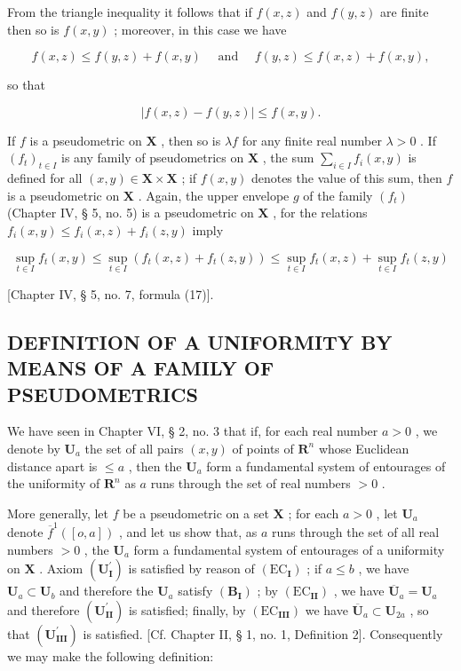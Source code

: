 From the triangle inequality it follows that if \(f(x, z)\) and \(f(y, z)\) are finite then so is \(f(x, y)\) ; moreover, in this case we have

\[
f (x, z) \leqslant f (y, z) + f (x, y) \quad \text { and } \quad f (y, z) \leqslant f (x, z) + f (x, y),
\]

so that

\[
\left| f (x, z) - f (y, z) \right| \leqslant f (x, y).\tag{1}
\]

If \(f\) is a pseudometric on \(\mathbf{X}\) , then so is \(\lambda f\) for any finite real number \(\lambda > 0\) . If \((f_t)_{t \in I}\) is any family of pseudometrics on \(\mathbf{X}\) , the sum \(\sum_{i \in I} f_i(x, y)\) is defined for all \((x, y) \in \mathbf{X} \times \mathbf{X}\) ; if \(f(x, y)\) denotes the value of this sum, then \(f\) is a pseudometric on \(\mathbf{X}\) . Again, the upper envelope \(g\) of the family \((f_t)\) (Chapter IV, § 5, no. 5) is a pseudometric on \(\mathbf{X}\) , for the relations \(f_i(x, y) \leqslant f_i(x, z) + f_i(z, y)\) imply

\[
\sup _ {t \in I} f _ {t} (x, y) \leqslant \sup _ {t \in I} \left(f _ {t} (x, z) + f _ {t} (z, y)\right) \leqslant \sup _ {t \in I} f _ {t} (x, z) + \sup _ {t \in I} f _ {t} (z, y)
\]

{[}Chapter IV, § 5, no. 7, formula (17){]}.

\subsection{DEFINITION OF A UNIFORMITY BY MEANS OF A FAMILY OF PSEUDOMETRICS}

We have seen in Chapter VI, § 2, no. 3 that if, for each real number \(a > 0\) , we denote by \(\mathbf{U}_a\) the set of all pairs \((x, y)\) of points of \(\mathbf{R}^n\) whose Euclidean distance apart is \(\leqslant a\) , then the \(\mathbf{U}_a\) form a fundamental system of entourages of the uniformity of \(\mathbf{R}^n\) as \(a\) runs through the set of real numbers \(> 0\) .

More generally, let \(f\) be a pseudometric on a set \(\mathbf{X}\) ; for each \(a > 0\) , let \(\mathbf{U}_a\) denote \(\overline{f}^{1}([o, a])\) , and let us show that, as \(a\) runs through the set of all real numbers \(> 0\) , the \(\mathbf{U}_a\) form a fundamental system of entourages of a uniformity on \(\mathbf{X}\) . Axiom \((\mathbf{U}_{\mathbf{I}}^{\prime})\) is satisfied by reason of \((\mathrm{EC}_{\mathbf{I}})\) ; if \(a \leqslant b\) , we have \(\mathbf{U}_a \subset \mathbf{U}_b\) and therefore the \(\mathbf{U}_a\) satisfy \((\mathbf{B}_{\mathbf{I}})\) ; by \((\mathrm{EC}_{\mathbf{II}})\) , we have \(\overline{\mathbf{U}}_a = \mathbf{U}_a\) and therefore \((\mathbf{U}_{\mathbf{II}}^{\prime})\) is satisfied; finally, by \((\mathrm{EC}_{\mathbf{III}})\) we have \(\overline{\mathbf{U}}_a \subset \mathbf{U}_{2a}\) , so that \((\mathbf{U}_{\mathbf{III}}^{\prime})\) is satisfied. {[}Cf. Chapter II, § 1, no. 1, Definition 2{]}. Consequently we may make the following definition:

